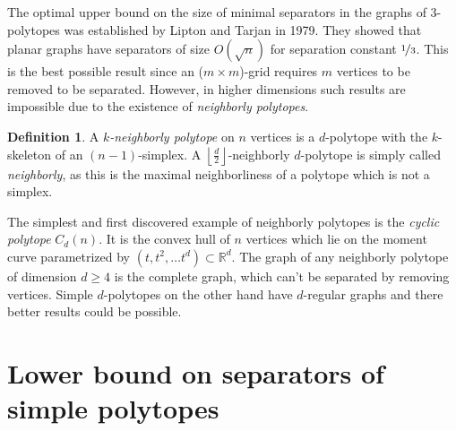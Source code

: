 \documentclass[a4paper,12pt]{book}
\theoremstyle{plain}
\newtheorem{conjecture}[theorem]{Conjecture}
\theoremstyle{definition}
\newtheorem{definition}[theorem]{Definition}
\newcommand\NC{\textrm{NCP}}
\begin{document}
The optimal upper bound on the size of minimal separators in the graphs of 3-polytopes was established by 
Lipton and Tarjan \cite{LiTa} in 1979. They showed that planar graphs have 
separators of size $O(\sqrt{n})$ for separation constant $\nicefrac{1}{3}$. This is 
the best possible result since an ($m\times m$)-grid requires $m$ vertices to be 
removed to be separated. However, in higher dimensions such results are 
impossible due to the existence of \textit{neighborly polytopes}.

\begin{definition}
 A \emph{$k$-neighborly polytope} on $n$ vertices is a $d$-polytope with the $k$-skeleton of an $(n-1)$-simplex.
A $\left\lfloor \frac{d}{2} \right\rfloor$-neighborly $d$-polytope is simply called \emph{neighborly}, as this is the maximal
neighborliness of a polytope which is not a simplex.
\end{definition}

The simplest and first discovered example of neighborly polytopes is the \textit{cyclic polytope} $C_d(n)$.
It is the convex hull of $n$ vertices which lie on the moment curve parametrized by $(t,t^2,\dots t^d) \subset \mathbb{R}^d$.
The graph of any neighborly polytope of dimension $d\geq 4$ is the complete graph, which can't be separated by removing vertices. Simple 
$d$-polytopes on the other hand have $d$-regular graphs and there better results could be 
possible. 

%
%
%
%


\chapter{Lower bound on separators of simple polytopes}
\label{ncpconstruction}
\end{document}
